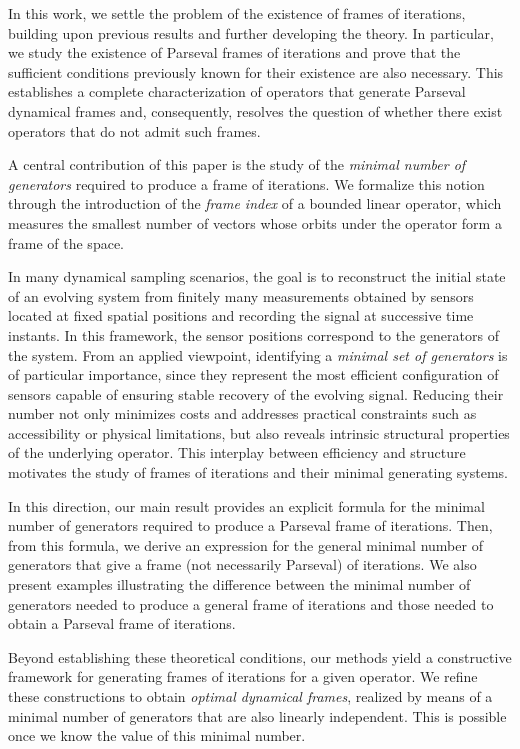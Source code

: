 \documentclass[a4paper,12pt]{amsart}
\theoremstyle{definition}
\begin{document}
In this work, we settle the problem of the existence of frames of iterations, building upon previous results and further developing the theory. In particular, we study the existence of Parseval frames of iterations and prove that the sufficient conditions previously known for their existence \cite{AP17} are also necessary. This establishes a complete characterization of operators that generate Parseval dynamical frames and, consequently, resolves the question of whether there exist operators that do not  admit such frames.

A central contribution of this paper is the study of the {\em minimal number of generators} required to produce a frame of iterations. We formalize this notion through the introduction of the {\em frame index} of a bounded linear operator, which measures the smallest number of vectors whose orbits under the operator form a frame of the space.

In many dynamical sampling scenarios, the goal is to reconstruct the initial state of an evolving system from finitely many measurements obtained by sensors located at fixed spatial positions and recording the signal at successive time instants. In this framework, the sensor positions correspond to the generators of the system. From an applied viewpoint, identifying a {\em minimal set of generators} is of particular importance, since they represent the most efficient configuration of sensors capable of ensuring stable recovery of the evolving signal. Reducing their number not only minimizes costs and addresses practical constraints such as accessibility or physical limitations, but also reveals intrinsic structural properties of the underlying operator. This interplay between efficiency and structure motivates the study of frames of iterations and their minimal generating systems.

In this direction, our main result provides an explicit formula for the minimal number of generators required to produce a Parseval frame of iterations. Then, from this formula, we derive an expression for the general minimal number of generators that give a frame (not necessarily Parseval) of iterations. We also present examples illustrating the difference between the minimal number of generators needed to produce a general frame of iterations and those needed to obtain a Parseval frame of iterations.

Beyond establishing these theoretical conditions, our methods yield a constructive framework for generating frames of iterations for a given operator. We refine these constructions to obtain {\em optimal dynamical frames}, realized by means of a minimal number of generators that are also linearly independent. This is possible once we know the value of this minimal number.
\end{document}
